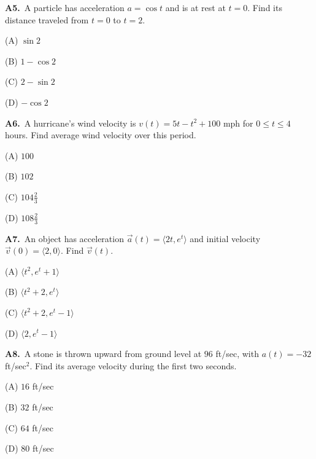 \documentclass[11pt]{article}
\begin{document}
\bigskip\noindent\textbf{A5.}\ A particle has acceleration $a=\cos t$ and is at rest at $t=0$. Find its distance traveled from $t=0$ to $t=2$.
\begin{list}{}{\setlength{\leftmargin}{3em}\setlength{\labelwidth}{2.5em}\setlength{\itemsep}{0pt}\setlength{\topsep}{2pt}}
\item[(A)] $\sin2$
\item[(B)] $1-\cos2$
\item[(C)] $2-\sin2$
\item[(D)] $-\cos2$
\end{list}

\bigskip\noindent\textbf{A6.}\ A hurricane's wind velocity is $v(t)=5t-t^2+100$ mph for $0\le t\le4$ hours. Find average wind velocity over this period.
\begin{list}{}{\setlength{\leftmargin}{3em}\setlength{\labelwidth}{2.5em}\setlength{\itemsep}{0pt}\setlength{\topsep}{2pt}}
\item[(A)] $100$
\item[(B)] $102$
\item[(C)] $104\tfrac23$
\item[(D)] $108\tfrac23$
\end{list}

\bigskip\noindent\textbf{A7.}\ An object has acceleration $\vec a(t)=\langle2t,e^t\rangle$ and initial velocity $\vec v(0)=\langle2,0\rangle$. Find $\vec v(t)$.
\begin{list}{}{\setlength{\leftmargin}{3em}\setlength{\labelwidth}{2.5em}\setlength{\itemsep}{0pt}\setlength{\topsep}{2pt}}
\item[(A)] $\langle t^2,e^t+1\rangle$
\item[(B)] $\langle t^2+2,e^t\rangle$
\item[(C)] $\langle t^2+2,e^t-1\rangle$
\item[(D)] $\langle2,e^t-1\rangle$
\end{list}

\bigskip\noindent\textbf{A8.}\ A stone is thrown upward from ground level at $96$ ft/sec, with $a(t)=-32$ ft/sec$^2$. Find its average velocity during the first two seconds.
\begin{list}{}{\setlength{\leftmargin}{3em}\setlength{\labelwidth}{2.5em}\setlength{\itemsep}{0pt}\setlength{\topsep}{2pt}}
\item[(A)] $16$ ft/sec
\item[(B)] $32$ ft/sec
\item[(C)] $64$ ft/sec
\item[(D)] $80$ ft/sec
\end{list}
\end{document}
